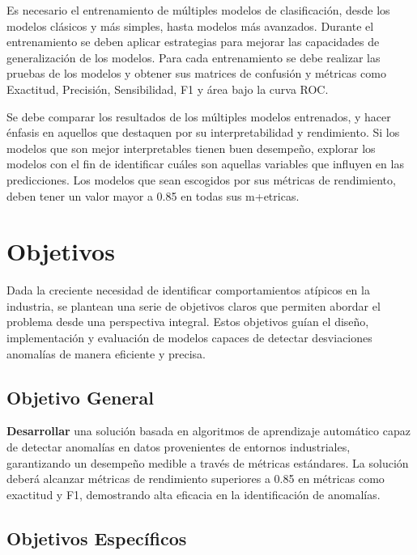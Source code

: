 \documentclass[11pt,a4paper,spanish]{book}
\numberwithin{equation}{chapter}
\numberwithin{figure}{chapter}
\begin{document}
Es necesario el entrenamiento de múltiples modelos de clasificación, desde los modelos 
clásicos y más simples, hasta modelos más avanzados. Durante el entrenamiento se deben 
aplicar estrategias para mejorar las capacidades de generalización de los modelos. 
Para cada entrenamiento se debe realizar las pruebas de los modelos y obtener sus 
matrices de confusión y métricas como  Exactitud, Precisión, Sensibilidad, F1 y 
área bajo la curva ROC.


Se debe comparar los resultados de los múltiples modelos entrenados, y hacer énfasis en 
aquellos que destaquen por su interpretabilidad y rendimiento. Si los modelos que son 
mejor interpretables tienen buen desempeño, explorar los modelos con el fin de 
identificar cuáles son aquellas variables que influyen en las predicciones. 
Los modelos que sean escogidos por sus métricas de rendimiento, deben tener un valor 
mayor a 0.85 en todas sus m+etricas. 


\chapter{Objetivos}

Dada la creciente necesidad de identificar comportamientos atípicos en la industria, 
se plantean una serie de objetivos claros que permiten abordar el problema desde una 
perspectiva integral. 
Estos objetivos guían el diseño, implementación y evaluación de modelos capaces de 
detectar desviaciones anomalías de manera eficiente y precisa.


\section{Objetivo General}

\textbf{Desarrollar} una solución basada en algoritmos de aprendizaje automático 
capaz de detectar anomalías en datos provenientes de entornos industriales, garantizando
un desempeño medible a través de métricas estándares.
La solución deberá alcanzar métricas de rendimiento superiores a 0.85 en métricas como
exactitud y F1, demostrando alta eficacia en la identificación de anomalías.

\section{Objetivos Específicos}
\end{document}
